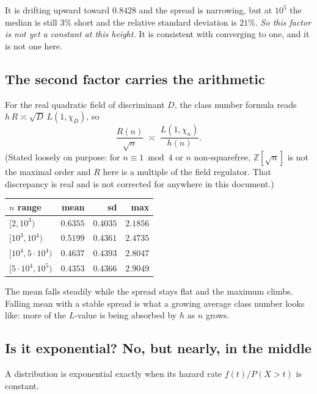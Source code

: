 \documentclass[12pt,a4paper]{article}
\begin{document}
It is drifting upward toward $0.8428$ and the spread is narrowing, but at $10^5$ the median is still $3\%$ short and the relative standard deviation is $21\%$. \emph{So this factor is not yet a constant at this height.} It is consistent with converging to one, and it is not one here.

\subsection*{The second factor carries the arithmetic}

For the real quadratic field of discriminant $D$, the class number formula reads $h\,R \asymp \sqrt{D}\,L(1,\chi_D)$, so
\[
  \frac{R(n)}{\sqrt{n}} \;\asymp\; \frac{L(1,\chi_n)}{h(n)} .
\]
(Stated loosely on purpose: for $n \equiv 1 \bmod 4$ or $n$ non-squarefree, $\mathbb{Z}[\sqrt{n}]$ is not the maximal order and $R$ here is a multiple of the field regulator. That discrepancy is real and is not corrected for anywhere in this document.)

\begin{center}
\begin{tabular}{lrrr}
\toprule
$n$ range & mean & sd & max \\
\midrule
$[2,10^3)$        & $0.6355$ & $0.4035$ & $2.1856$ \\
$[10^3,10^4)$     & $0.5199$ & $0.4361$ & $2.4735$ \\
$[10^4,5\cdot10^4)$ & $0.4637$ & $0.4393$ & $2.8047$ \\
$[5\cdot10^4,10^5)$ & $0.4353$ & $0.4366$ & $2.9049$ \\
\bottomrule
\end{tabular}
\end{center}

The mean falls steadily while the spread stays flat and the maximum climbs. Falling mean with a stable spread is what a growing average class number looks like: more of the $L$-value is being absorbed by $h$ as $n$ grows.

\subsection*{Is it exponential? No, but nearly, in the middle}

A distribution is exponential exactly when its hazard rate $f(t)/P(X>t)$ is constant.
\end{document}
